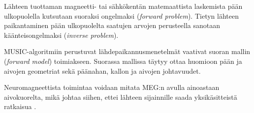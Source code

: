 Lähteen tuottaman magneetti- tai sähkökentän matemaattista laskemista pään ulkopuolella kutsutaan suoraksi ongelmaksi (\textit{forward problem}). Tietyn lähteen paikantaminen pään ulkopuolelta saatujen arvojen perusteella sanotaan käänteisongelmaksi (\textit{inverse problem}).

MUSIC-algoritmiin perustuvat lähdepaikannusmenetelmät vaativat suoran mallin (\textit{forward model}) toimiakseen. Suorassa mallissa täytyy ottaa huomioon pään ja aivojen geometriat sekä päänahan, kallon ja aivojen johtavuudet. \citep{hansen2010meg}

Neuromagneettista toimintaa voidaan mitata MEG:n avulla ainoastaan aivokuorelta, mikä johtaa siihen, ettei lähteen sijainnille saada yksikäsitteistä ratkaisua \citep[s. 2]{hansen2010meg}.
